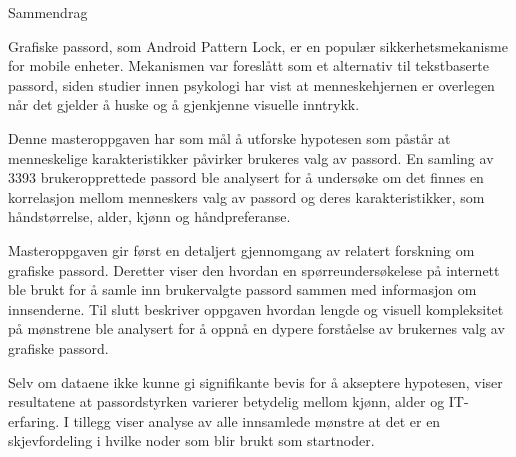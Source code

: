 {\centering 

	{\Huge Sammendrag}

	\vspace{1cm}

	Grafiske passord, som Android Pattern Lock, er en populær sikkerhetsmekanisme for mobile enheter. Mekanismen var foreslått som et alternativ til tekstbaserte passord, siden studier innen psykologi har vist at menneskehjernen er overlegen når det gjelder å huske og å gjenkjenne visuelle inntrykk.

	Denne masteroppgaven har som mål å utforske hypotesen som påstår at menneskelige karakteristikker påvirker brukeres valg av passord. En samling av 3393 brukeropprettede passord ble analysert for å undersøke om det finnes en korrelasjon mellom menneskers valg av passord og deres karakteristikker, som håndstørrelse, alder, kjønn og håndpreferanse.

	Masteroppgaven gir først en detaljert gjennomgang av relatert forskning om grafiske passord. Deretter viser den hvordan en spørreundersøkelese på internett ble brukt for å samle inn brukervalgte passord sammen med informasjon om innsenderne. Til slutt beskriver oppgaven hvordan lengde og visuell kompleksitet på mønstrene ble analysert for å oppnå en dypere forståelse av brukernes valg av grafiske passord.

	Selv om dataene ikke kunne gi signifikante bevis for å akseptere hypotesen, viser resultatene at passordstyrken varierer betydelig mellom kjønn, alder og IT-erfaring. I tillegg viser analyse av alle innsamlede mønstre at det er en skjevfordeling i hvilke noder som blir brukt som startnoder. 
}
\clearpage
\mbox{}
\thispagestyle{empty}
\newpage

	
